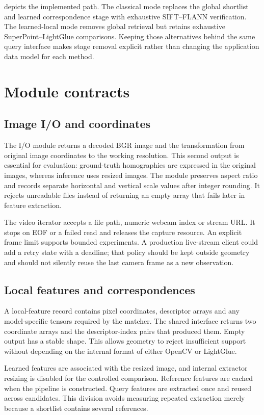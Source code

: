  depicts the implemented path. The classical mode replaces the global shortlist and learned correspondence stage with exhaustive SIFT--FLANN verification. The learned-local mode removes global retrieval but retains exhaustive SuperPoint--LightGlue comparisons. Keeping those alternatives behind the same query interface makes stage removal explicit rather than changing the application data model for each method.

\section{Module contracts}
\subsection{Image I/O and coordinates}
The I/O module returns a decoded BGR image and the transformation from original image coordinates to the working resolution. This second output is essential for evaluation: ground-truth homographies are expressed in the original images, whereas inference uses resized images. The module preserves aspect ratio and records separate horizontal and vertical scale values after integer rounding. It rejects unreadable files instead of returning an empty array that fails later in feature extraction.

The video iterator accepts a file path, numeric webcam index or stream URL. It stops on EOF or a failed read and releases the capture resource. An explicit frame limit supports bounded experiments. A production live-stream client could add a retry state with a deadline; that policy should be kept outside geometry and should not silently reuse the last camera frame as a new observation.

\subsection{Local features and correspondences}
A local-feature record contains pixel coordinates, descriptor arrays and any model-specific tensors required by the matcher. The shared interface returns two coordinate arrays and the descriptor-index pairs that produced them. Empty output has a stable shape. This allows geometry to reject insufficient support without depending on the internal format of either OpenCV or LightGlue.

Learned features are associated with the resized image, and internal extractor resizing is disabled for the controlled comparison. Reference features are cached when the pipeline is constructed. Query features are extracted once and reused across candidates. This division avoids measuring repeated extraction merely because a shortlist contains several references.

